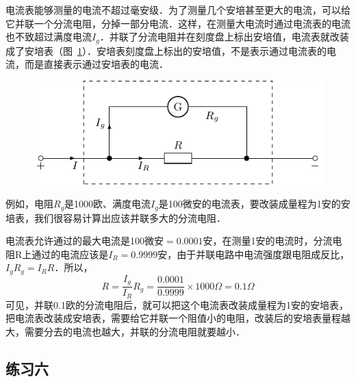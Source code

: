 电流表能够测量的电流不超过毫安级．为了测量几个安培甚至更大的电流，可以给它并联一个分流电阻，分掉一部分电流．这样，在测量大电流时通过电流表的电流也不致超过满度电流$I_g$．并联了分流电阻并在刻度盘上标出安培值，电流表就改装成了安培表（图~\ref{fig_B_7-17}）．安培表刻度盘上标出的安培值，不是表示通过电流表的电流，而是直接表示通过安培表的电流．
\begin{figure}[htbp]
    \centering
    \includegraphics{fig/B/7-17.pdf}
    \caption{}\label{fig_B_7-17}
\end{figure}

例如，电阻$R_g$是1000欧、满度电流$I_g$是100微安的电流表，要改装成量程为1安的安培表，我们很容易计算出应该并联多大的分流电阻．

电流表允许通过的最大电流是100微安$=0.0001$安，在测量1安的电流时，分流电阻R上通过的电流应该是$I_R=0.9999$安，由于并联电路中电流强度跟电阻成反比，$I_gR_g=I_R R$．所以，
\[R=\frac{I_g}{I_R}R_g=\frac{0.0001}{0.9999}\times 1000\Omega=0.1\Omega\]
可见，并联0.1欧的分流电阻后，就可以把这个电流表改装成量程为1安的安培表，把电流表改装成安培表，需要给它并联一个阻值小的电阻，改装后的安培表量程越大，需要分去的电流也越大，并联的分流电阻就要越小．


\subsection*{练习六}

